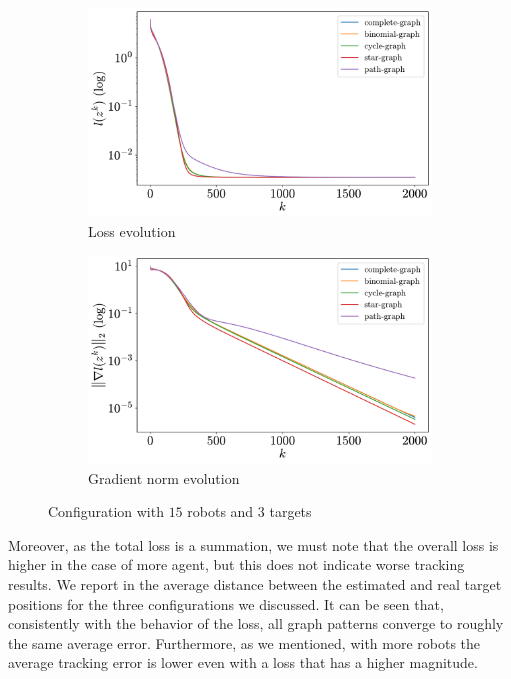 \documentclass[a4paper,11pt,oneside]{book}
\begin{document}
\begin{figure}[ht]
      \centering
      \begin{subfigure}[t]{0.49\textwidth}
            \centering
            \includegraphics[width=\linewidth]{./figs/tracking/loss_15_3_2_2000.pdf} 
            \caption{Loss evolution}
      \end{subfigure}
      \hfill
      \begin{subfigure}[t]{0.49\textwidth}
            \centering
            \includegraphics[width=\linewidth]{./figs/tracking/gradient_15_3_2_2000.pdf} 
            \caption{Gradient norm evolution}
      \end{subfigure}
      \caption{Configuration with $15$ robots and $3$ targets}
      \label{fig:tracking_15_3}
\end{figure}

Moreover, as the total loss is a summation, we must note that the overall loss is higher in the case of more agent, but this does not indicate worse tracking results. We report in  the average distance between the estimated and real target positions for the three configurations we discussed. It can be seen that, consistently with the behavior of the loss, all graph patterns converge to roughly the same average error. Furthermore, as we mentioned, with more robots the average tracking error is lower even with a loss that has a higher magnitude.
\end{document}
